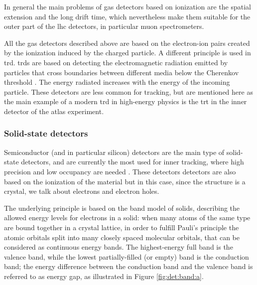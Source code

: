 In general the main problems of gas detectors based on ionization are the spatial extension and the long drift time, 
which nevertheless make them suitable for the outer part of the \gls{lhc} detectors, in particular muon spectrometers.

All the gas detectors described above are based on the electron-ion pairs created by the ionization induced by the charged particle. A different principle is used in \gls{trd}. \glspl{trd} are based on detecting the electromagnetic radiation emitted by particles that cross boundaries between different media below the Cherenkov threshold \cite{1402-4896-1982-T2A-024}. The energy radiated increases with the energy of the incoming particle. These detectors are less common for tracking, but are mentioned here as the main example of a modern \gls{trd} in high-energy physics is the \gls{trt} in the inner detector of the \gls{atlas} experiment.

\subsubsection*{Solid-state detectors}

Semiconductor (and in particular silicon) detectors are the main type of solid-state detectors, and are currently the most used for inner tracking, 
where high precision and low occupancy are needed \cite{Hartmann:2009zza}. 
These detectors detectors are also based on the ionization of the material but in this case, since the structure is a crystal, 
we talk about electrons and electron holes. 

The underlying principle is based on the band model of solids, describing the allowed energy levels for electrons in a solid: when many atoms of the same type are bound together in a crystal lattice, in order to fulfill Pauli's principle the atomic orbitals split into many closely spaced molecular orbitals, that can be considered as continuous energy bands. The highest-energy full band is the valence band, while the lowest partially-filled (or empty) band is the conduction band; the energy difference between the conduction band and the valence band is referred to as energy gap, as illustrated in Figure \ref{fig:det:band:a}. 

